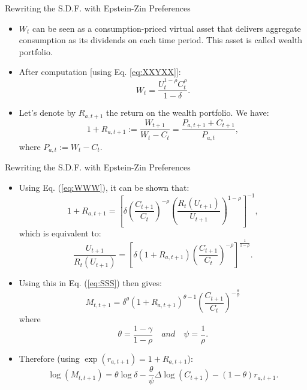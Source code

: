 \begin{frame}{Rewriting the S.D.F. with Epstein-Zin Preferences}
\begin{footnotesize}
\begin{itemize}
	\item $W_t$ can be seen as a consumption-priced virtual asset that delivers aggregate consumption as its dividends on each time period. This asset is called {\color{blue}wealth portfolio}. 
	\item After computation [using Eq. \ref{eq:XXYXX}]:
	\begin{equation}\label{eq:WWW}
	W_t = \frac{U_t^{1-\rho}C_t^\rho}{1 - \delta}.
	\end{equation}
	\item Let's denote by $R_{a,t+1}$ the return on the wealth portfolio. We have:
	\begin{equation}\label{eq:Ra}
	1+R_{a,t+1} := \frac{W_{t+1}}{W_t - C_t} = \frac{P_{a,t+1}+C_{t+1}}{P_{a,t}},
	\end{equation}
	where $P_{a,t} := W_t - C_t$.
\end{itemize}
\end{footnotesize}
\end{frame}

\begin{frame}{Rewriting the S.D.F. with Epstein-Zin Preferences}
\begin{footnotesize}
\begin{itemize}
	\item Using Eq. (\ref{eq:WWW}), it can be shown that:
	$$
	1+R_{a,t+1} = \left[ \delta \left( \frac{C_{t+1}}{C_t} \right)^{-\rho} \left( \frac{R_t(U_{t+1})}{U_{t+1}} \right)^{1-\rho} \right]^{-1},
	$$
	which is equivalent to:
	$$
	\frac{U_{t+1}}{R_t(U_{t+1})} = \left[ \delta (1+ R_{a,t+1}) \left( \frac{C_{t+1}}{C_t} \right)^{-\rho}  \right]^{\frac{1}{1-\rho}}.
	$$
	\item Using this in Eq. (\ref{eq:SSS}) then gives:
	\begin{equation}
	M_{t,t+1} =  \delta^{\theta} (1+R_{a,t+1})^{\theta - 1} \left( \frac{C_{t+1}}{C_t} \right)^{- \frac{\theta}{\psi}}
	\end{equation}
	where
	$$
	\theta = \frac{1-\gamma}{1-\rho} \quad and \quad \psi = \frac{1}{\rho}.
	$$
	\item Therefore (using $\exp(r_{a,t+1})=1+R_{a,t+1}$):
	\begin{equation}\label{eq:sdfEZ}
	\boxed{\log(M_{t,t+1}) = \theta \log \delta - \frac{\theta}{\psi} \Delta \log(C_{t+1}) - (1-\theta) r_{a,t+1}.}
	\end{equation}
\end{itemize}
\end{footnotesize}
\end{frame}


